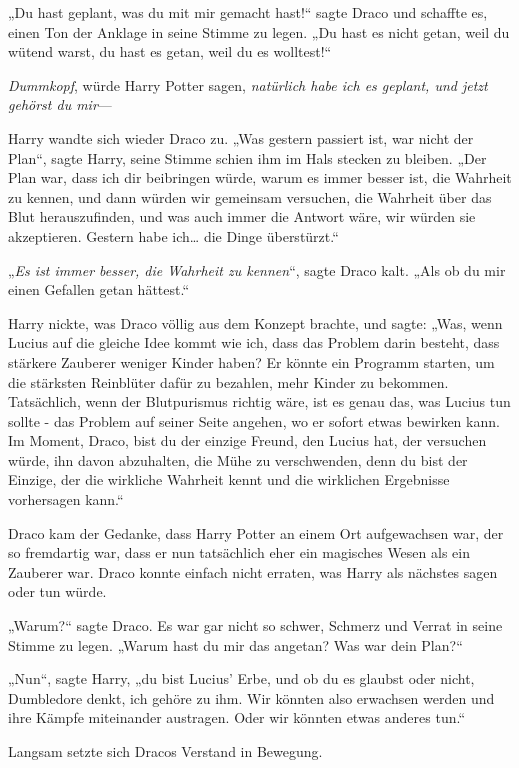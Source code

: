 {„Du hast geplant, was du mit mir gemacht hast!“ sagte Draco und schaffte es, einen Ton der Anklage in seine Stimme zu legen. „Du hast es nicht getan, weil du wütend warst, du hast es getan, weil du es wolltest!“

\emph{Dummkopf}, würde Harry Potter sagen, \emph{natürlich habe ich es geplant, und jetzt gehörst du mir}—

Harry wandte sich wieder Draco zu. „Was gestern passiert ist, war nicht der Plan“, sagte Harry, seine Stimme schien ihm im Hals stecken zu bleiben. „Der Plan war, dass ich dir beibringen würde, warum es immer besser ist, die Wahrheit zu kennen, und dann würden wir gemeinsam versuchen, die Wahrheit über das Blut herauszufinden, und was auch immer die Antwort wäre, wir würden sie akzeptieren. Gestern habe ich… die Dinge überstürzt.“

„\emph{Es ist immer besser, die Wahrheit zu kennen}“, sagte Draco kalt. „Als ob du mir einen Gefallen getan hättest.“

Harry nickte, was Draco völlig aus dem Konzept brachte, und sagte: „Was, wenn Lucius auf die gleiche Idee kommt wie ich, dass das Problem darin besteht, dass stärkere Zauberer weniger Kinder haben? Er könnte ein Programm starten, um die stärksten Reinblüter dafür zu bezahlen, mehr Kinder zu bekommen. Tatsächlich, wenn der Blutpurismus richtig wäre, ist es genau das, was Lucius tun sollte - das Problem auf seiner Seite angehen, wo er sofort etwas bewirken kann. Im Moment, Draco, bist du der einzige Freund, den Lucius hat, der versuchen würde, ihn davon abzuhalten, die Mühe zu verschwenden, denn du bist der Einzige, der die wirkliche Wahrheit kennt und die wirklichen Ergebnisse vorhersagen kann.“

Draco kam der Gedanke, dass Harry Potter an einem Ort aufgewachsen war, der so fremdartig war, dass er nun tatsächlich eher ein magisches Wesen als ein Zauberer war. Draco konnte einfach nicht erraten, was Harry als nächstes sagen oder tun würde.

„Warum?“ sagte Draco. Es war gar nicht so schwer, Schmerz und Verrat in seine Stimme zu legen. „Warum hast du mir das angetan? Was war dein Plan?“

„Nun“, sagte Harry, „du bist Lucius' Erbe, und ob du es glaubst oder nicht, Dumbledore denkt, ich gehöre zu ihm. Wir könnten also erwachsen werden und ihre Kämpfe miteinander austragen. Oder wir könnten etwas anderes tun.“

Langsam setzte sich Dracos Verstand in Bewegung.

}
